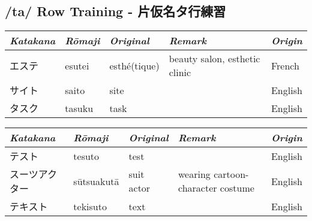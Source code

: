 \subsection{/ta/ Row Training - 片仮名タ行練習}
\Padding
\begin{longtable}[c]{p{2cm}p{2cm}p{3cm}p{6cm}p{2cm}}
\textit{Katakana}&\textit{Rōmaji}&\textit{Original}&\textit{Remark}&\textit{Origin}\\\hline
エステ        &esutei    &esthé(tique)&beauty salon, esthetic clinic    &French\\
サイト        &saito     &site        &&English\\
タスク        &tasuku    &task        &&English\\
\end{longtable}



\newpage
\Padding
\begin{longtable}[c]{p{2.6cm}p{2cm}p{1.8cm}p{6.6cm}p{1.8cm}}
\textit{Katakana}&\textit{Rōmaji}&\textit{Original}&\textit{Remark}&\textit{Origin}\\\hline
テスト        &tesuto    &test        &                                 &English\\
スーツアクター&sūtsuakutā&suit actor  &wearing cartoon-character costume&English\\
テキスト      &tekisuto  &text        &                                 &English\\
\end{longtable}



\newpage

